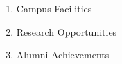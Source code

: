 
\begin{enumerate}
    \item Campus Facilities
    \item Research Opportunities
    \item Alumni Achievements
\end{enumerate}
